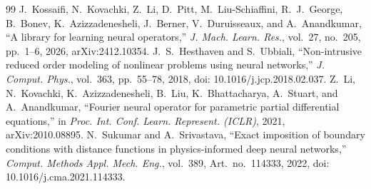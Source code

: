 \documentclass[11pt]{article}
\begin{document}
\begin{thebibliography}{99}
 J.~Kossaifi, N.~Kovachki, Z.~Li, D.~Pitt, M.~Liu-Schiaffini, R.~J.~George, B.~Bonev, K.~Azizzadenesheli, J.~Berner, V.~Duruisseaux, and A.~Anandkumar, ``A library for learning neural operators,'' \emph{J. Mach. Learn. Res.}, vol.~27, no.~205, pp.~1--6, 2026, arXiv:2412.10354.
 J.~S.~Hesthaven and S.~Ubbiali, ``Non-intrusive reduced order modeling of nonlinear problems using neural networks,'' \emph{J. Comput. Phys.}, vol.~363, pp.~55--78, 2018, doi: 10.1016/j.jcp.2018.02.037.
 Z.~Li, N.~Kovachki, K.~Azizzadenesheli, B.~Liu, K.~Bhattacharya, A.~Stuart, and A.~Anandkumar, ``Fourier neural operator for parametric partial differential equations,'' in \emph{Proc. Int. Conf. Learn. Represent. (ICLR)}, 2021, arXiv:2010.08895.
 N.~Sukumar and A.~Srivastava, ``Exact imposition of boundary conditions with distance functions in physics-informed deep neural networks,'' \emph{Comput. Methods Appl. Mech. Eng.}, vol.~389, Art.~no.~114333, 2022, doi: 10.1016/j.cma.2021.114333.
\end{thebibliography}
\end{document}
